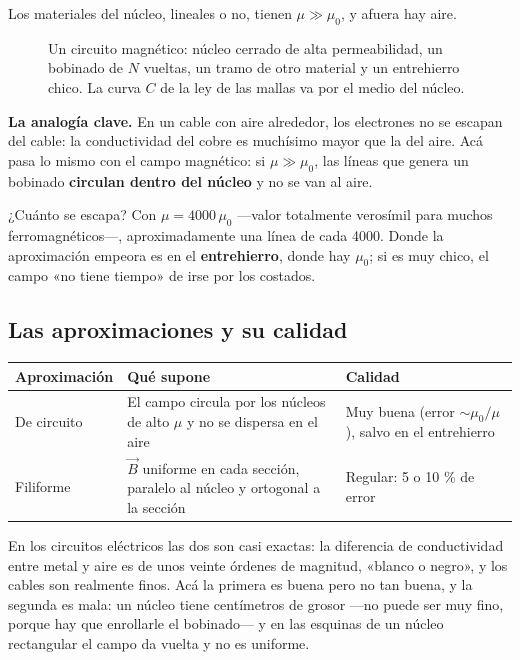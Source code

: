 \documentclass[12pt,a4paper]{article}
\begin{document}
Los materiales del núcleo, lineales o no, tienen $\mu\gg\mu_0$, y afuera hay
aire.

\begin{figure}[H]
  \centering
  
  \caption{Un circuito magnético: núcleo cerrado de alta permeabilidad, un bobinado de $N$ vueltas, un tramo de otro material y un entrehierro chico. La curva $C$ de la ley de las mallas va por el medio del núcleo.}
\end{figure}

\textbf{La analogía clave.} En un cable con aire alrededor, los electrones no se
escapan del cable: la conductividad del cobre es muchísimo mayor que la del
aire. Acá pasa lo mismo con el campo magnético: si $\mu\gg\mu_0$, las líneas que
genera un bobinado \textbf{circulan dentro del núcleo} y no se van al aire.

¿Cuánto se escapa? Con $\mu = 4000\,\mu_0$ ---valor totalmente verosímil para
muchos ferromagnéticos---, aproximadamente una línea de cada 4000. Donde la
aproximación empeora es en el \textbf{entrehierro}, donde hay $\mu_0$; si es muy
chico, el campo «no tiene tiempo» de irse por los costados.

\subsection{Las aproximaciones y su calidad}

\begin{center}
\renewcommand{\arraystretch}{1.35}
\small
\begin{tabularx}{\textwidth}{l>{\raggedright\arraybackslash}X>{\raggedright\arraybackslash}X}
\toprule
\textbf{Aproximación} & \textbf{Qué supone} & \textbf{Calidad} \\
\midrule
De circuito & El campo circula por los núcleos de alto $\mu$ y no se dispersa en el aire & Muy buena (error $\sim\mu_0/\mu$), salvo en el entrehierro \\
Filiforme & $\vec B$ uniforme en cada sección, paralelo al núcleo y ortogonal a la sección & Regular: 5 o 10 \% de error \\
\bottomrule
\end{tabularx}
\end{center}

En los circuitos eléctricos las dos son casi exactas: la diferencia de
conductividad entre metal y aire es de unos veinte órdenes de magnitud, «blanco
o negro», y los cables son realmente finos. Acá la primera es buena pero no tan
buena, y la segunda es mala: un núcleo tiene centímetros de grosor ---no puede ser
muy fino, porque hay que enrollarle el bobinado--- y en las esquinas de un núcleo
rectangular el campo da vuelta y no es uniforme.
\end{document}
